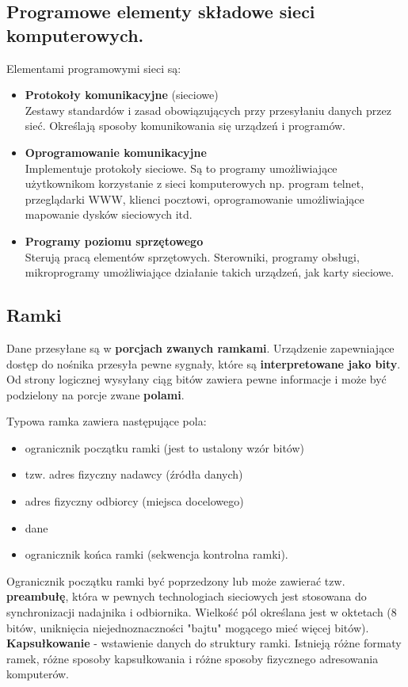 \documentclass[a4paper]{article}
\begin{document}
\subsection{Programowe	elementy	składowe	sieci	komputerowych.}
Elementami	programowymi	sieci	są:
\begin{itemize}
    \item \textbf{Protokoły	 komunikacyjne} (sieciowe)\\
    Zestawy standardów i zasad obowiązujących przy	 przesyłaniu danych	przez	sieć. Określają sposoby komunikowania się urządzeń	i	programów.
    \item \textbf{Oprogramowanie	komunikacyjne}\\
    Implementuje protokoły sieciowe. Są to programy	 umożliwiające	 użytkownikom	 korzystanie	 z
    sieci	 komputerowych	 np. program telnet, przeglądarki WWW, klienci pocztowi, oprogramowanie	umożliwiające mapowanie	dysków	sieciowych	itd.
    \item \textbf{Programy	 poziomu	 sprzętowego}\\
    Sterują pracą elementów	 sprzętowych. Sterowniki, programy	 obsługi, mikroprogramy umożliwiające	działanie	takich	urządzeń,	jak	karty	sieciowe.
\end{itemize}

\subsection{Ramki}
Dane przesyłane są w \textbf{porcjach zwanych ramkami}. Urządzenie	zapewniające dostęp	do nośnika przesyła	pewne sygnały, które są \textbf{interpretowane jako bity}. Od strony	logicznej wysyłany	ciąg bitów zawiera	pewne informacje i może	być	podzielony na porcje zwane \textbf{polami}.

Typowa ramka zawiera następujące pola:
\begin{itemize}
    \item ogranicznik początku ramki (jest	to	ustalony	wzór	bitów)
    \item tzw.	adres fizyczny nadawcy (źródła	danych)
    \item adres	fizyczny odbiorcy (miejsca	docelowego)
    \item dane
    \item ogranicznik końca	ramki (sekwencja	kontrolna	ramki).
\end{itemize}
Ogranicznik	 początku ramki być poprzedzony lub może zawierać tzw. \textbf{preambułę}, która w pewnych technologiach sieciowych jest stosowana do synchronizacji nadajnika i
odbiornika. Wielkość pól określana jest w oktetach (8 bitów, uniknięcia niejednoznaczności "bajtu" mogącego mieć więcej bitów). \textbf{Kapsułkowanie} - wstawienie danych do struktury ramki. Istnieją różne formaty ramek, różne sposoby kapsułkowania i różne sposoby fizycznego adresowania komputerów.
\end{document}
